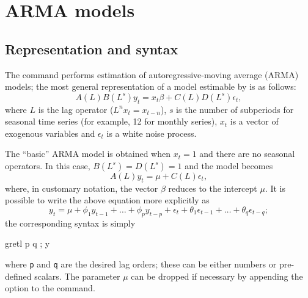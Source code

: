 \chapter{ARMA models}
\label{arma-estimation}

\section{Representation and syntax}
\label{arma-repr}

The  command performs estimation of autoregressive-moving
average (ARMA) models; the most general representation of a model
estimable by  is as follows:
\begin{equation}
  \label{eq:general-arma}
  A(L) B(L^s) y_t = x_t \beta + C(L) D(L^s) \epsilon_t ,
\end{equation}
where $L$ is the lag operator ($L^n x_t = x_{t-n}$), $s$ is the
number of subperiods for seasonal time series (for example, 12 for
monthly series), $x_t$ is a vector of exogenous variables and
$\epsilon_t$ is a white noise process.

The ``basic'' ARMA model is obtained when $x_t = 1$ and there are no
seasonal operators. In this case, $B(L^s) = D(L^s) = 1$ and the model
becomes
\begin{equation}
  \label{eq:plain-arma}
  A(L) y_t = \mu + C(L) \epsilon_t ,
\end{equation}
where, in customary notation, the vector $\beta$ reduces to the
intercept $\mu$. It is possible to write the above equation more
explicitly as
\[
  y_t = \mu + \phi_1 y_{t-1} + \ldots + \phi_p y_{t-p} + 
  \epsilon_t + \theta_1 \epsilon_{t-1} + \ldots + \theta_q
  \epsilon_{t-q} ;
\]
the corresponding  syntax is simply
\begin{code}
  gretl p q ; y
\end{code}
where \verb|p| and \verb|q| are the desired lag orders; these can be
either numbers or pre-defined scalars. The parameter $\mu$ can be
dropped if necessary by appending the option  to the command.

